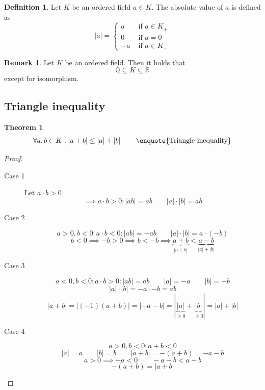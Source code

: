 \documentclass[a4paper,landscape,twocolumn]{article}
\theoremstyle{definition}
\newtheorem{theorem}{Theorem}
\newtheorem{defi}{Definition}
\newtheorem{rem}{Remark}
\newcommand\abs[1]{\left|#1\right|}
\begin{document}
\begin{defi}
  Let $K$ be an ordered field $a \in K$.
  The absolute value of $a$ is defined as
  \[
    \abs{a} = \begin{cases}
      a & \text{ if } a \in K_+ \\
      0 & \text{ if } a = 0 \\
      -a & \text{ if } a \in K_-
    \end{cases}
  \]
\end{defi}

\begin{rem}
  Let $K$ be an ordered field. Then it holds that
  \[ \mathbb{Q} \subseteq K \subseteq \mathbb{R} \]
  except for isomorphism.
\end{rem}

\subsection{Triangle inequality}
\begin{theorem}
  \[ \forall a, b \in K: \abs{a + b} \leq \abs{a} + \abs{b} \qquad \text{\enquote{Triangle inequality}} \]
\end{theorem}
\begin{proof}
  \begin{description}
    \item[Case 1] Let $a \cdot b > 0$
      \[ \implies a \cdot b > 0: \abs{ab} = ab \qquad \abs{a}\cdot\abs{b} = ab \]
    \item[Case 2]
      \[ a > 0, b < 0: a \cdot b < 0: \abs{ab} = -ab \qquad \abs{a} \cdot \abs{b} = a \cdot (-b) \]
      \[ b < 0 \implies -b > 0 \implies b < -b \implies \underbrace{a + b}_{\abs{a + b}} < \underbrace{a - b}_{\abs{a} + \abs{b}} \]
    \item[Case 3]
      \[ a < 0, b < 0: a \cdot b > 0: \abs{ab} = ab \qquad \abs{a} = -a \qquad \abs{b} = -b  \]
      \[ \abs{a} \cdot \abs{b} = -a \cdot -b = a b \]
      \[ \abs{a + b} = \abs{(-1)(a + b)} = \abs{-a-b} = \abs{\underbrace{\abs{a}}_{\geq 0} + \underbrace{\abs{b}}_{\geq 0}} = \abs{a} + \abs{b} \]
    \item[Case 4]
      \[ a > 0, b < 0: a + b < 0 \]
      \[ \abs{a} = a \qquad \abs{b} = b \qquad \abs{a + b} = -(a + b) = -a - b \]
      \[ a > 0 \implies -a < 0 \qquad -a - b < a - b \]
      \[ -(a + b) = \abs{a + b} \]
  \end{description}
\end{proof}
\end{document}
